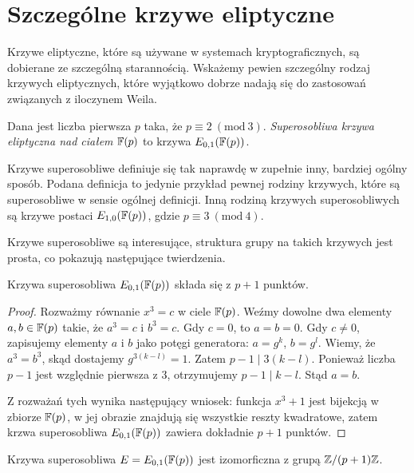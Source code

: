\section{Szczególne krzywe eliptyczne}

\noindent
Krzywe eliptyczne, które są używane w systemach kryptograficznych,
są dobierane ze szczególną starannością.
Wskażemy pewien szczególny rodzaj krzywych eliptycznych,
które wyjątkowo dobrze nadają się do zastosowań
związanych z iloczynem Weila.

\begin{definition}
Dana jest liczba pierwsza $p$ taka, że $p \equiv 2\ (\mathrm{mod}\ 3)$.
\emph{Superosobliwa krzywa eliptyczna nad ciałem $\mathbb{F}(p)$}
to krzywa $E_{0,1}(\mathbb{F}(p))$.
\end{definition}

\begin{remark}
Krzywe superosobliwe definiuje się tak naprawdę w zupełnie inny,
bardziej ogólny sposób. Podana definicja to jedynie przykład
pewnej rodziny krzywych, które są superosobliwe w sensie ogólnej definicji.
Inną rodziną krzywych superosobliwych są krzywe postaci $E_{1,0}(\mathbb{F}(p))$,
gdzie $p \equiv 3\ (\mathrm{mod}\ 4)$.
\end{remark}

\noindent
Krzywe superosobliwe są interesujące,
struktura grupy na takich krzywych jest prosta,
co pokazują następujące twierdzenia.

\begin{theorem}
Krzywa superosobliwa $E_{0,1}(\mathbb{F}(p))$ składa się z $p + 1$ punktów.
\end{theorem}

\begin{proof}
Rozważmy równanie $x^3 = c$ w ciele $\mathbb{F}(p)$.
Weźmy dowolne dwa elementy $a, b \in \mathbb{F}(p)$ takie, że $a^3 = c$ i $b^3 = c$.
Gdy $c = 0$, to $a = b = 0$.
Gdy $c \neq 0$, zapisujemy elementy $a$ i $b$ jako potęgi generatora:
$a = g^k$, $b = g^l$.
Wiemy, że $a^3 = b^3$, skąd dostajemy $g^{3(k-l)} = 1$.
Zatem $p-1 \mid 3(k-l)$.
Ponieważ liczba $p-1$ jest względnie pierwsza z $3$,
otrzymujemy $p-1 \mid k-l$.
Stąd $a = b$.

\noindent
Z rozważań tych wynika następujący wniosek:
funkcja $x^3 + 1$ jest bijekcją w zbiorze $\mathbb{F}(p)$,
w jej obrazie znajdują się wszystkie reszty kwadratowe,
zatem krzwa superosobliwa $E_{0,1}(\mathbb{F}(p))$ zawiera dokładnie $p+1$ punktów.
\end{proof}

\begin{theorem}
Krzywa superosobliwa $E = E_{0,1}(\mathbb{F}(p))$
jest izomorficzna z grupą $\mathbb{Z} / (p+1)\mathbb{Z}$.
\end{theorem}

